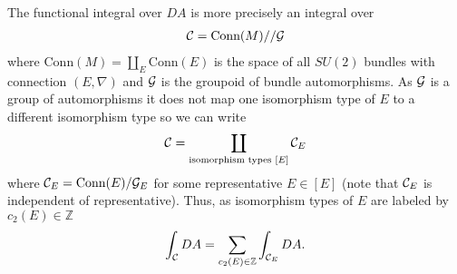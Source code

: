 \documentclass[12pt, onecolumn]{article}
\newenvironment{note}[1][Note]{\begin{trivlist}
\item[\hskip \labelsep {\bfseries #1}]}{\end{trivlist}}
\begin{document}
\begin{note}
The functional integral over $DA$ is more precisely an integral over
\begin{align*}
{\cal C}=\text{Conn}(M)//{\cal G}
\end{align*}
where $\text{Conn}(M)=\coprod_{E}\text{Conn}(E)$ is the space of all $SU(2)$ bundles with connection $(E,\nabla)$ and ${\cal G}$ is the groupoid of bundle automorphisms.  As ${\cal G}$ is a group of automorphisms it does not map one isomorphism type of $E$ to a different isomorphism type so we can write
\begin{align*}
{\cal C}=\coprod_{\text{isomorphism types $[E]$}}{\cal C}_{E}
\end{align*}
where ${\cal C}_{E}=\text{Conn}(E)/{\cal G}_{E}$ for some representative $E \in [E]$ (note that ${\cal C}_{E}$ is independent of representative).  Thus, as isomorphism types of $E$ are labeled by $c_{2}(E) \in \mathbb{Z}$
\begin{align*}
\int_{{\cal C}} DA = \sum_{c_{2}(E) \in \mathbb{Z}} \int_{{\cal C}_{E}} DA.
\end{align*}
\end{note}
\end{document}
